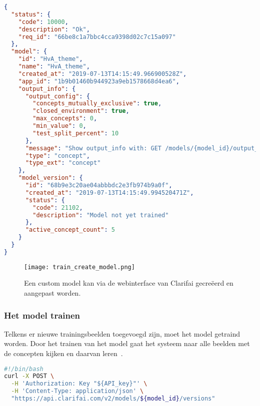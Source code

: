 \begin{lstlisting}[language=json,caption=Antwoord van de API na het creëren van het model]
{
  "status": {
    "code": 10000,
    "description": "Ok",
    "req_id": "66be8c1a7bbc4cca9398d02c7c15a097"
  },
  "model": {
    "id": "HvA_theme",
    "name": "HvA_theme",
    "created_at": "2019-07-13T14:15:49.966900528Z",
    "app_id": "1b9b01460b944923a9eb1578668d4ea6",
    "output_info": {
      "output_config": {
        "concepts_mutually_exclusive": true,
        "closed_environment": true,
        "max_concepts": 0,
        "min_value": 0,
        "test_split_percent": 10
      },
      "message": "Show output_info with: GET /models/{model_id}/output_info",
      "type": "concept",
      "type_ext": "concept"
    },
    "model_version": {
      "id": "68b9e3c20ae04abbbdc2e3fb974b9a0f",
      "created_at": "2019-07-13T14:15:49.994520471Z",
      "status": {
        "code": 21102,
        "description": "Model not yet trained"
      },
      "active_concept_count": 5
    }
  }
}
\end{lstlisting}

\begin{figure}[h]
	\centering
	\texttt{[image: train\_create\_model.png]}\hfill
	\caption[Een model maken via de webinterface]{Een custom model kan via de webinterface van Clarifai gecreëerd en aangepast worden.}
	\label{fig:model-maken}
\end{figure}


\subsubsection{Het model trainen}
\label{subsubsec:model-trainen}

Telkens er nieuwe trainingsbeelden toegevoegd zijn, moet het model getraind worden. Door het trainen van het model gaat het systeem naar alle beelden met de concepten kijken en daarvan leren~\autocite{ClarifaiAPI}. 


\begin{lstlisting}[language=bash,caption=Bash commando om het model te trainen]
#!/bin/bash
curl -X POST \
  -H 'Authorization: Key "${API_key}"' \
  -H 'Content-Type: application/json' \
  "https://api.clarifai.com/v2/models/${model_id}/versions" 
\end{lstlisting}

